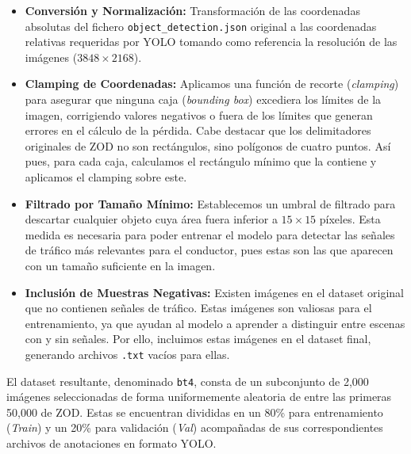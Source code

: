 \documentclass[11pt,a4paper]{article}
\begin{document}
\begin{itemize}
    \item \textbf{Conversión y Normalización:} Transformación de las coordenadas absolutas del 
            fichero \texttt{object\_detection.json} original a las coordenadas relativas requeridas por YOLO 
            tomando como referencia la resolución de las imágenes ($3848 \times 2168$).
    
    \item \textbf{Clamping de Coordenadas:} Aplicamos una función de recorte (\textit{clamping}) 
            para asegurar que ninguna caja (\textit{bounding box}) excediera los límites de la imagen, 
            corrigiendo valores negativos o fuera de los límites que generan errores en el cálculo de la pérdida.
            Cabe destacar que los delimitadores originales de ZOD no son rectángulos, sino polígonos de cuatro puntos.
            Así pues, para cada caja, calculamos el rectángulo mínimo que la contiene y aplicamos el clamping sobre este.
    
    \item \textbf{Filtrado por Tamaño Mínimo:} Establecemos un umbral de filtrado para descartar cualquier 
            objeto cuya área fuera inferior a $15 \times 15$ píxeles. Esta medida es necesaria
            para poder entrenar el modelo para detectar las señales de tráfico más relevantes
            para el conductor, pues estas son las que aparecen con un tamaño suficiente en la imagen.

    \item \textbf{Inclusión de Muestras Negativas:} Existen imágenes en el dataset original que no contienen señales de tráfico. 
            Estas imágenes son valiosas para el entrenamiento, ya que ayudan al modelo a aprender a distinguir entre 
            escenas con y sin señales. Por ello, incluimos estas imágenes en el dataset final, 
            generando archivos \texttt{.txt} vacíos para ellas.
\end{itemize}

El dataset resultante, denominado \texttt{bt4}, consta de un subconjunto de 2,000 imágenes 
seleccionadas de forma uniformemente aleatoria de entre las primeras 50,000 de ZOD. 
Estas se encuentran divididas en un 80\% para entrenamiento (\textit{Train}) y un 20\% 
para validación (\textit{Val}) acompañadas de sus correspondientes archivos de anotaciones en formato YOLO.
\end{document}
